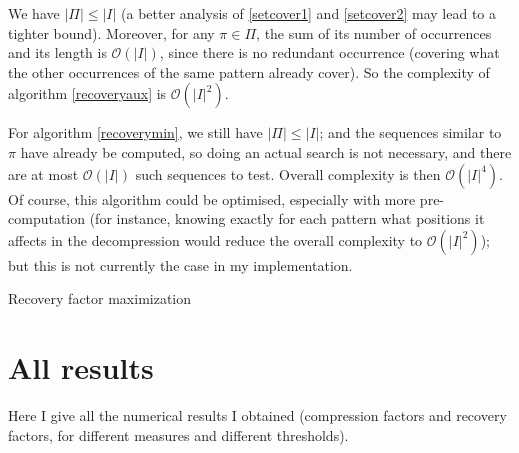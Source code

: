 \documentclass[a4paper,10pt]{article}
\newcommand{\bigO}[1]{\mathcal O\left( #1 \right)}
\begin{document}
We have $|\Pi|\leq|I|$ (a better analysis of \ref{setcover1} and \ref{setcover2} may lead to a tighter bound). Moreover, for any $\pi\in\Pi$, the sum of its number of occurrences and its length is $\bigO{|I|}$, since there is no redundant occurrence (covering what the other occurrences of the same pattern already cover). So the complexity of algorithm \ref{recoveryaux} is $\bigO{|I|^2}$.

For algorithm \ref{recoverymin}, we still have $|\Pi|\leq|I|$; and the sequences similar to $\pi$ have already be computed, so doing an actual search is not necessary, and there are at most $\bigO{|I|}$ such sequences to test. Overall complexity is then $\bigO{|I|^4}$. Of course, this algorithm could be optimised, especially with more pre-computation (for instance, knowing exactly for each pattern what positions it affects in the decompression would reduce the overall complexity to $\bigO{|I|^2}$); but this is not currently the case in my implementation.

\begin{algorithm}
\caption{Recovery factor maximization \label{recoverymin}}
 
     
  


\end{algorithm}

\clearpage

\section{All results}

Here I give all the numerical results I obtained (compression factors and recovery factors, for different measures and different thresholds).
\end{document}
